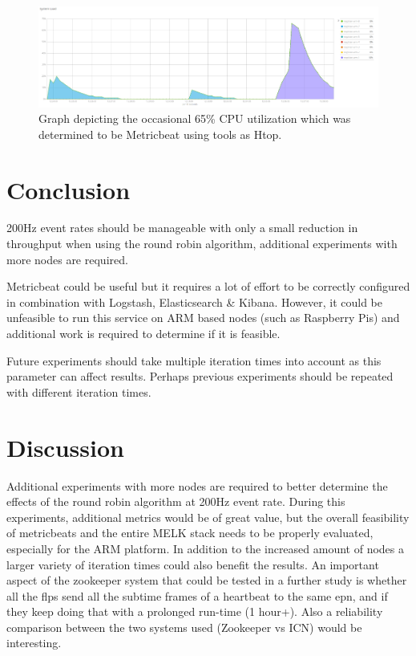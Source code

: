 \documentclass[]{article}
\begin{document}
\begin{center}
	\begin{figure}[H]
		\includegraphics[width=\textwidth]{images/metric-load}
		\caption{Graph depicting the occasional 65\% CPU utilization which was determined to be Metricbeat using tools as Htop.}
		\label{fig:ssh}
	\end{figure}
\end{center}

\section{Conclusion}
200Hz event rates should be manageable with only a small reduction in throughput when using the round robin algorithm, additional experiments with more nodes are required.

Metricbeat could be useful but it requires a lot of effort to be correctly configured in combination with Logstash, Elasticsearch \& Kibana. However, it could be unfeasible to run this service on ARM based nodes (such as Raspberry Pis) and additional work is required to determine if it is feasible.

Future experiments should take multiple iteration times into account as this parameter can affect results. Perhaps previous experiments should be repeated with different iteration times.

\section{Discussion}
Additional experiments with more nodes are required to better determine the effects of the round robin algorithm at 200Hz event rate. During this experiments, additional metrics would be of great value, but the overall feasibility of metricbeats and the entire MELK stack needs to be properly evaluated, especially for the ARM platform. In addition to the increased amount of nodes a larger variety of iteration times could also benefit the results.
An important aspect of the zookeeper system that could be tested in a further study is whether all the flps send all the subtime frames of a heartbeat to the same epn, and if they keep doing that with a prolonged run-time (1 hour+). Also a reliability comparison between the two systems used (Zookeeper vs ICN) would be interesting.
\end{document}
